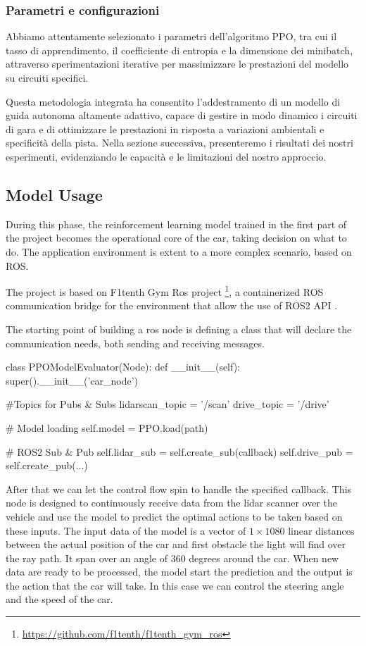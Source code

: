 \documentclass[conference]{IEEEtran}
\begin{document}
\subsubsection{Parametri e configurazioni}
Abbiamo attentamente selezionato i parametri dell'algoritmo PPO, tra cui il tasso di apprendimento, il coefficiente di entropia e la dimensione dei minibatch, attraverso sperimentazioni iterative per massimizzare le prestazioni del modello su circuiti specifici.

\medskip

Questa metodologia integrata ha consentito l'addestramento di un modello di guida autonoma altamente adattivo, capace di gestire in modo dinamico i circuiti di gara e di ottimizzare le prestazioni in risposta a variazioni ambientali e specificità della pista. Nella sezione successiva, presenteremo i risultati dei nostri esperimenti, evidenziando le capacità e le limitazioni del nostro approccio.

%
%
%
\subsection{Model Usage}

During this phase, the reinforcement learning model trained in the first part of the project becomes the operational core of the car, taking decision on what to do.
%
The application environment is extent to a more complex scenario, based on ROS.

The project is based on F1tenth Gym Ros project \footnote{\url{https://github.com/f1tenth/f1tenth\_gym\_ros}}, a containerized ROS communication bridge for the environment that allow the use of ROS2 API \cite{Ros2}.

The starting point of building a ros node is defining a class that will declare the communication needs, both sending and receiving messages.

\begin{python}
class PPOModelEvaluator(Node):
  def __init__(self):
    super().__init__('car_node')

    #Topics for Pubs & Subs
    lidarscan_topic = '/scan'
    drive_topic = '/drive'

    # Model loading
    self.model = PPO.load(path)

    # ROS2 Sub & Pub
    self.lidar_sub =
      self.create_sub(callback)
    self.drive_pub =
      self.create_pub(...)
\end{python}

After that we can let the control flow spin to handle the specified callback.
%
This node is designed to continuously receive data from the lidar scanner over the vehicle and use the model to predict the optimal actions to be taken based on these inputs.
%
The input data of the model is a vector of $ 1\times1080 $ linear distances between the actual position of the car and first obstacle the light will find over the ray path.
%
It span over an angle of 360 degrees around the car.
%
When new data are ready to be processed, the model start the prediction and the output is the action that the car will take.
%
In this case we can control the steering angle and the speed of the car.
\end{document}
